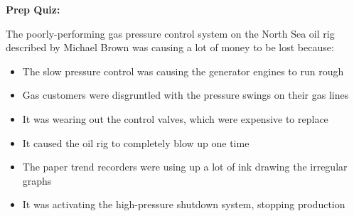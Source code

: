 \vfil \eject

\noindent
{\bf Prep Quiz:}

The poorly-performing gas pressure control system on the North Sea oil rig described by Michael Brown was causing a lot of money to be lost because:

\begin{itemize}
\item{} The slow pressure control was causing the generator engines to run rough
\vskip 5pt 
\item{} Gas customers were disgruntled with the pressure swings on their gas lines
\vskip 5pt 
\item{} It was wearing out the control valves, which were expensive to replace
\vskip 5pt 
\item{} It caused the oil rig to completely blow up one time
\vskip 5pt 
\item{} The paper trend recorders were using up a lot of ink drawing the irregular graphs
\vskip 5pt 
\item{} It was activating the high-pressure shutdown system, stopping production
\end{itemize}





